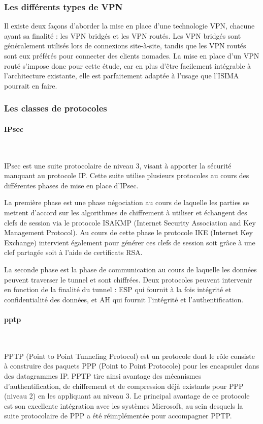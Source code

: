 \subsubsection{Les différents types de VPN}

Il existe deux façons d'aborder la mise en place d'une technologie VPN, chacune ayant sa finalité : les VPN bridgés et les VPN routés. Les VPN bridgés sont généralement utilisés lors de connexions site-à-site, tandis que les VPN routés sont eux préférés pour connecter des clients nomades. La mise en place d'un VPN routé s'impose donc pour cette étude, car en plus d'être facilement intégrable à l'architecture existante, elle est parfaitement adaptée à l'usage que l'ISIMA pourrait en faire.

\subsubsection{Les classes de protocoles}
\paragraph{IPsec}
~

IPsec est une suite protocolaire de niveau 3, visant à apporter la sécurité manquant au protocole IP. Cette suite utilise plusieurs protocoles au cours des différentes phases de mise en place d'IPsec.

La première phase est une phase négociation au cours de laquelle les parties se mettent d'accord sur les algorithmes de chiffrement à utiliser et échangent des clefs de session via le protocole ISAKMP (Internet Security Association and Key Management Protocol). Au cours de cette phase le protocole IKE (Internet Key Exchange) intervient également pour générer ces clefs de session soit grâce à une clef partagée soit à l'aide de certificats RSA.

La seconde phase est la phase de communication au cours de laquelle les données peuvent traverser le tunnel et sont chiffrées. Deux protocoles peuvent intervenir en fonction de la finalité du tunnel : ESP qui fournit à la fois intégrité et confidentialité des données, et AH qui fournit l'intégrité et l'authentification.


\paragraph{pptp}
~

PPTP (Point to Point Tunneling Protocol) est un protocole dont le rôle consiste à construire des paquets PPP (Point to Point Protocole) pour les encapsuler dans des datagrammes IP. PPTP tire ainsi avantage des mécanismes d'authentification, de chiffrement et de compression déjà existants pour PPP (niveau 2) en les appliquant au niveau 3. Le principal avantage de ce protocole est son excellente intégration avec les systèmes Microsoft, au sein desquels la suite protocolaire de PPP a été réimplémentée pour accompagner PPTP.

